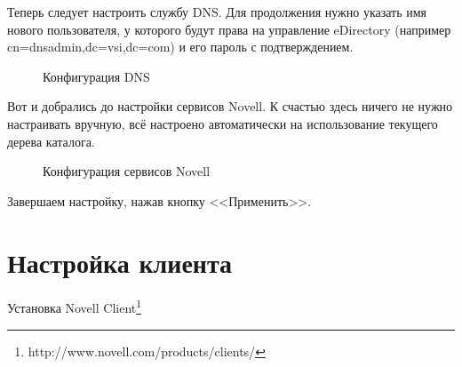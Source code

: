 Теперь следует настроить службу DNS. Для продолжения нужно указать имя нового пользователя, у которого будут права на управление eDirectory (например cn=dnsadmin,dc=vsi,dc=com) и его пароль с подтверждением.
\begin{figure}[H]
\caption{Конфигурация DNS}
\end{figure}
\clearpage

Вот и добрались до настройки сервисов Novell. К счастью здесь ничего не нужно настраивать вручную, всё настроено автоматически на использование текущего дерева каталога.
\begin{figure}[H]
\caption{Конфигурация сервисов Novell}
\end{figure}
Завершаем настройку, нажав кнопку <<Применить>>.

\clearpage
\section{Настройка клиента}
Установка Novell Client\footnote{http://www.novell.com/products/clients/}